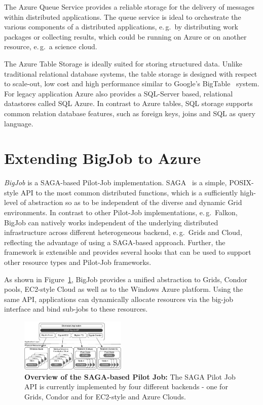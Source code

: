 \documentclass[conference,final]{IEEEtran}
\newcommand{\up}{\vspace*{-1em}}
\begin{document}
The Azure Queue Service provides a reliable storage for the delivery
of messages within distributed applications.  The queue service is
ideal to orchestrate the various components of a distributed
applications, e.\,g.\ by distributing work packages or collecting
results, which could be running on Azure or on another resource,
e.\,g.\ a science cloud.

The Azure Table Storage is ideally suited for storing structured
data. Unlike traditional relational database systems, the table
storage is designed with respect to scale-out, low cost and high
performance similar to Google's BigTable~\cite{bigtable2006}
system. For legacy application Azure also provides a SQL-Server based,
relational datastores called SQL Azure. In contrast to Azure tables,
SQL storage supports common relation database features, such as
foreign keys, joins and SQL as query language.


\section{Extending BigJob to Azure }
\label{sec:bigjob-saga}

\emph{BigJob} is a SAGA-based Pilot-Job implementation. SAGA~\cite{saga_url} 
is a simple, POSIX-style API to the most common distributed functions, which 
is a sufficiently high-level of abstraction so as to be 
independent of the diverse and dynamic Grid environments. 
In contrast to other Pilot-Job implementations, e.\,g.\ Falkon, BigJob can
natively works independent of the underlying distributed infrastructure across different
heterogeneous backend, e.\,g.\ Grids and Cloud, reflecting the
advantage of using a SAGA-based approach. Further, the framework is
extensible and provides several hooks that can be used to support
other resource types and Pilot-Job frameworks.

As shown in Figure~\ref{fig:figures_distributed_pilot_job}, BigJob 
provides a unified abstraction to Grids, Condor pools,
EC2-style Cloud as well as to the Windows Azure platform.
Using the same API, applications can dynamically allocate
resources via the big-job interface and bind sub-jobs to these
resources. 

\begin{figure}[htbp]
    \centering
        \includegraphics[width=0.45\textwidth]{figures/distributed_pilot_job}
        \caption{\textbf{Overview of the SAGA-based Pilot Job:} The
          SAGA Pilot Job API is currently implemented by four
          different backends - one for Grids, Condor and for
          EC2-style and Azure Clouds.\up}
    \label{fig:figures_distributed_pilot_job}
\end{figure}
\end{document}
